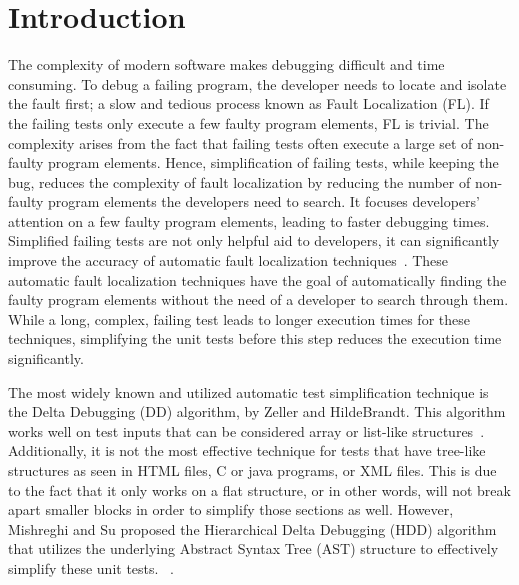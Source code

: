 

\chapter{Introduction} \label{CH1_Introduction}

The complexity of modern software makes debugging difficult and time consuming. To debug a failing program, the developer needs to locate and isolate the fault first; a slow and tedious process known as Fault Localization (FL). If the failing tests only execute a few faulty program elements, FL is trivial. The complexity arises from the fact that failing tests often execute a large set of non-faulty program elements. Hence, simplification of failing tests, while keeping the bug, reduces the complexity of fault localization by reducing the number of non-faulty program elements the developers need to search. It focuses developers' attention on a few faulty program elements, leading to faster debugging times. Simplified failing tests are not only helpful aid to developers, it can significantly improve the accuracy of automatic fault localization techniques~\cite{vince2021reduction,christi18reduce}. These automatic fault localization techniques have the goal of automatically finding the faulty program elements without the need of a developer to search through them. While a long, complex, failing test leads to longer execution times for these techniques, simplifying the unit tests before this step reduces the execution time significantly.

The most widely known and utilized automatic test simplification technique is the Delta Debugging (DD) algorithm, by Zeller and HildeBrandt. This algorithm works well on test inputs that can be considered array or list-like structures~\cite{zeller2002simplifying}. Additionally, it is not the most effective technique for tests that have tree-like structures as seen in HTML files, C or java programs, or XML files. This is due to the fact that it only works on a flat structure, or in other words, will not break apart smaller blocks in order to simplify those sections as well. However, Mishreghi and Su proposed the Hierarchical Delta Debugging (HDD) algorithm that utilizes the underlying Abstract Syntax Tree (AST) structure to effectively simplify these unit tests. ~\cite{misherghi2006hdd}. 

